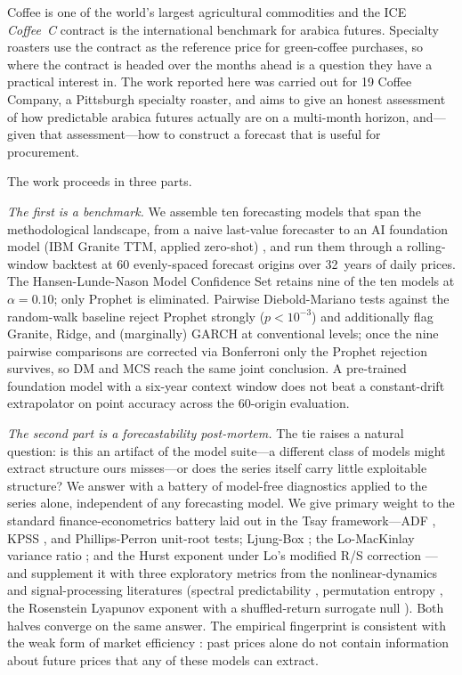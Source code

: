 \documentclass[conference]{IEEEtran}
\begin{document}
Coffee is one of the world's largest agricultural commodities and the
ICE \emph{Coffee~C} contract is the international benchmark for
arabica futures. Specialty roasters use the contract as the reference
price for green-coffee purchases, so where the contract is headed
over the months ahead is a question they have a practical interest
in. The work reported here was carried out for 19 Coffee Company, a
Pittsburgh specialty roaster, and aims to give an honest assessment
of how predictable arabica futures actually are on a multi-month
horizon, and---given that assessment---how to construct a forecast
that is useful for procurement.

The work proceeds in three parts.

\emph{The first is a benchmark.} We assemble ten forecasting models
that span the methodological landscape, from a naive last-value
forecaster to an AI foundation model (IBM Granite TTM, applied
zero-shot) \cite{ekambaram2024ttm}, and run them through a
rolling-window backtest at 60 evenly-spaced forecast origins over
32~years of daily prices. The Hansen-Lunde-Nason Model Confidence Set
\cite{hansen2011model} retains nine of the ten models at
$\alpha = 0.10$; only Prophet \cite{taylor2018forecasting} is
eliminated. Pairwise Diebold-Mariano tests against the random-walk
baseline \cite{diebold1995comparing,harvey1997testing} reject
Prophet strongly ($p < 10^{-3}$) and additionally flag Granite,
Ridge, and (marginally) GARCH at conventional levels; once the
nine pairwise comparisons are corrected via Bonferroni only the
Prophet rejection survives, so DM and MCS reach the same joint
conclusion. A pre-trained foundation model with a six-year context
window does not beat a constant-drift extrapolator on point accuracy
across the 60-origin evaluation.

\emph{The second part is a forecastability post-mortem.}
The tie raises a natural question: is this an artifact of the model
suite---a different class of models might extract structure ours
misses---or does the series itself carry little exploitable
structure? We answer with a battery of model-free diagnostics applied
to the series alone, independent of any forecasting model. We give primary
weight to the standard finance-econometrics battery laid out in the
Tsay \cite{tsay2010analysis} framework---ADF
\cite{dickey1979distribution}, KPSS \cite{kwiatkowski1992testing},
and Phillips-Perron \cite{phillips1988testing} unit-root tests;
Ljung-Box \cite{ljung1978measure}; the Lo-MacKinlay variance ratio
\cite{lo1988stock}; and the Hurst exponent \cite{hurst1951long} under
Lo's modified R/S correction \cite{lo1991long}---and supplement it
with three exploratory metrics from the nonlinear-dynamics and
signal-processing literatures (spectral predictability
\cite{wang2025spectral}, permutation entropy
\cite{bandt2002permutation}, the Rosenstein Lyapunov exponent
\cite{rosenstein1993practical} with a shuffled-return surrogate null
\cite{theiler1992testing}). Both halves converge on the same answer.
The empirical fingerprint is consistent with the weak form of market
efficiency \cite{fama1970efficient}: past prices alone do not contain
information about future prices that any of these models can extract.
\end{document}
